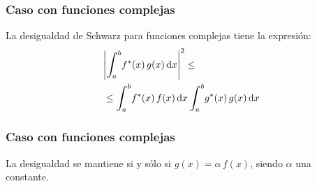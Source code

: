 \documentclass[12pt]{beamer}
\begin{document}
\begin{frame}
\frametitle{Caso con funciones complejas}
La desigualdad de Schwarz para funciones complejas tiene la expresión:
\pause
\begin{align}
\begin{aligned}
&\abs{ \scaleint{6ex}_{\bs a}^{b} f^{*} (x) \, g(x) \dd{x} }^{2} \leq \\
&\leq \scaleint{6ex}_{\bs a}^{b} f^{*}(x) \, f(x) \dd{x} \scaleint{6ex}_{\bs a}^{b} g^{*}(x) \, g(x) \dd{x}
\end{aligned}
\label{eq:ecuacion_10_78}
\end{align}
\end{frame}
\begin{frame}
\frametitle{Caso con funciones complejas}
La desigualdad se mantiene si y sólo si $g(x) = \alpha \, f(x)$, siendo $\alpha$ una constante.
\end{frame}
\end{document}
